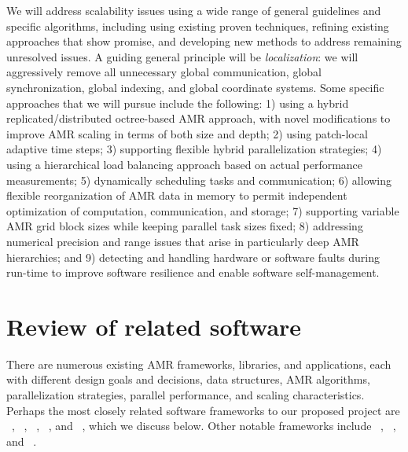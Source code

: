 \documentclass[11pt,letterpaper]{article}
\begin{document}
 We will address scalability issues
using a wide range of general guidelines and specific algorithms,
including using existing proven techniques, refining existing
approaches that show promise, and developing new methods to
address remaining unresolved issues.  A guiding general principle will
be \textit{localization}: we will aggressively remove all unnecessary global
communication, global synchronization, global indexing, and global
coordinate systems.  Some specific approaches that we will pursue
include the following:
%
1) using a hybrid replicated/distributed octree-based AMR approach, with
novel modifications to improve AMR scaling in terms of both size 
and depth;
% 
2) using patch-local adaptive time steps;
% 
3) supporting flexible hybrid parallelization strategies;
% 
4) using a hierarchical load balancing approach based on actual
performance measurements;
% 
5) dynamically scheduling tasks and communication;
% 
6) allowing flexible reorganization of AMR data in memory to permit
independent optimization of computation, communication, and storage;
% 
7) supporting variable AMR grid block sizes while keeping
parallel task sizes fixed;
% 
8) addressing numerical precision and range issues that arise in
particularly deep AMR hierarchies;
% 
and 9) detecting and handling hardware or software faults during
run-time to improve software resilience and enable software
self-management.


\section{Review of related software} \label{s:review}

There are numerous existing AMR frameworks, libraries, and applications, each
with different design goals and decisions, data structures, AMR
algorithms, parallelization strategies, parallel
performance, and scaling characteristics.  Perhaps the most closely
related software frameworks to our proposed project are
\samrai~\cite{wwwsamraicode,WiHo01},
\chombo~\cite{wwwchombo,CoGr09},
\paramesh~\cite{wwwparamesh,MaOl00,Ol06,OlMa05},
\alps~\cite{BuBu09}, and 
\gadget~\cite{Sp05,wwwgadget}, which
we discuss below.  Other notable frameworks include
\clawpack~\cite{wwwclawpack}, \grace~\cite{PaLi10}, and
\carpet~\cite{wwwcarpet,ScDi06}.  
\end{document}

